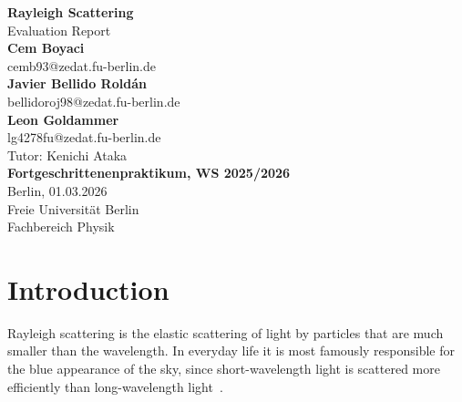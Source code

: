 \documentclass[a4paper]{article}
\begin{document}
\begin{titlepage}
  \thispagestyle{empty}
  \begin{center}

    \vspace*{1cm}
    {\LARGE \textbf{Rayleigh Scattering}}\\[1.2cm]

    {\large Evaluation Report}\\[2cm]

    \large
    \textbf{Cem Boyaci}\\[-1mm]
    {cemb93@zedat.fu-berlin.de}\\[1cm]

    \textbf{Javier Bellido Roldán}\\[-1mm]
    {bellidoroj98@zedat.fu-berlin.de}\\[1cm]

    \textbf{Leon Goldammer}\\[-1mm]
    {lg4278fu@zedat.fu-berlin.de}\\[6cm]

    \normalsize
    {Tutor: Kenichi Ataka}\\[1.2cm]

    \textbf{Fortgeschrittenenpraktikum, WS 2025/2026}\\
    Berlin, 01.03.2026\\
    Freie Universität Berlin\\
    Fachbereich Physik

  \end{center}
\end{titlepage}

\clearpage
\renewcommand*\contentsname{\huge Contents}
{
  \tableofcontents
  \clearpage
}

\newpage
\setcounter{page}{1}
\section{Introduction}
\label{sec:introduction}

Rayleigh scattering is the elastic scattering of light by particles that are much smaller than the wavelength.
In everyday life it is most famously responsible for the blue appearance of the sky, since short-wavelength light is scattered more efficiently than long-wavelength light~\cite{RAYAnleitung}.
\end{document}
